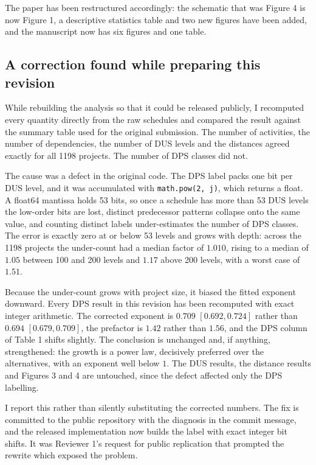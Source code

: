 \documentclass[11pt,a4paper]{article}
\begin{document}
The paper has been restructured accordingly: the schematic that was Figure 4 is
now Figure 1, a descriptive statistics table and two new figures have been
added, and the manuscript now has six figures and one table.

\subsection*{A correction found while preparing this revision}

While rebuilding the analysis so that it could be released publicly, I
recomputed every quantity directly from the raw schedules and compared the
result against the summary table used for the original submission. The number of
activities, the number of dependencies, the number of DUS levels and the
distances agreed exactly for all 1198 projects. The number of DPS classes did
not.

The cause was a defect in the original code. The DPS label packs one bit per DUS
level, and it was accumulated with \texttt{math.pow(2,\,j)}, which returns a
float. A float64 mantissa holds 53 bits, so once a schedule has more than 53 DUS
levels the low-order bits are lost, distinct predecessor patterns collapse onto
the same value, and counting distinct labels under-estimates the number of DPS
classes. The error is exactly zero at or below 53 levels and grows with depth:
across the 1198 projects the under-count had a median factor of $1.010$, rising
to a median of $1.05$ between 100 and 200 levels and $1.17$ above 200 levels,
with a worst case of $1.51$.

Because the under-count grows with project size, it biased the fitted exponent
downward. Every DPS result in this revision has been recomputed with exact
integer arithmetic. The corrected exponent is $0.709$ $[0.692, 0.724]$ rather
than $0.694$ $[0.679, 0.709]$, the prefactor is $1.42$ rather than $1.56$, and
the DPS column of Table 1 shifts slightly. The conclusion is
unchanged and, if anything, strengthened: the growth is a power law, decisively
preferred over the alternatives, with an exponent well below $1$. The DUS
results, the distance results and Figures 3 and 4 are untouched, since the
defect affected only the DPS labelling.

I report this rather than silently substituting the corrected numbers. The fix
is committed to the public repository with the diagnosis in the commit message,
and the released implementation now builds the label with exact integer bit
shifts. It was Reviewer 1's request for public replication that prompted the
rewrite which exposed the problem.
\end{document}
